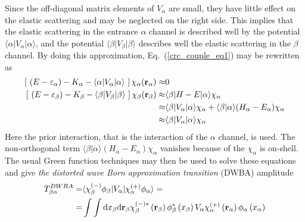 \documentclass[
11pt, %
english, %
onehalfspacing, %
headsepline, %
]{MastersDoctoralThesis} %
\begin{document}
Since the off-diagonal matrix elements of $V_\alpha$ are small, they have little effect on the elastic scattering and may be neglected on the right side. 
This implies that the elastic scattering in the entrance $\alpha$ channel is described well by the potential $\langle \alpha \vert V_\alpha \vert \alpha \rangle$, and the potential $\langle \beta \vert V_\beta \vert \beta \rangle$ describes well the elastic scattering in the $\beta$ channel.
By doing this approximation, Eq.~(\ref{crc_couple_eq1}) may be rewritten as
\begin{align}
\left[ ~\left(E-\varepsilon_\alpha \right)  -K_\alpha -
\langle \alpha \vert V_\alpha \vert \alpha \rangle ~\right] 
\chi_\alpha ({\bf r}_\alpha) \approx & 0
 \nonumber \\
\left[ ~\left(E-\varepsilon_\beta \right)  -K_\beta -
\langle \beta \vert V_\beta \vert \beta \rangle ~\right] 
\chi_\beta ({\bf r}_\beta) \approx &
\langle \beta \vert H-E \vert \alpha \rangle \chi_\alpha
\nonumber \\
\approx &
\langle \beta \vert V_\alpha \vert  \alpha \rangle \chi_\alpha + \langle \beta \vert \alpha \rangle (H_\alpha - E_\alpha) \chi_\alpha 
\nonumber \\
\approx & \langle \beta \vert V_\alpha \vert  \alpha \rangle \chi_\alpha
\label{crc_couple_eq2}
\end{align}
 Here the prior interaction, that is the interaction of the $\alpha$ channel, is used. The non-orthogonal term $\langle \beta \vert \alpha \rangle (H_\alpha - E_\alpha) \chi_\alpha$ vanishes because of the $\chi_\alpha$ is on-shell. The usual Green function techniques may then be used to solve these equations and give \textit{the  distorted wave Born approximation transition} (DWBA) amplitude 
 \begin{align}
 T_{\beta \alpha}^{DWBA} =& \langle \chi_\beta^{(-)} \phi_\beta  \vert V_\alpha \vert
 \chi_\alpha^{(+)} \phi_\alpha \rangle = \nonumber \\
= & \int \int \text{d}x_\beta \text{d}{\bf r}_\beta \chi_\beta^{(-)*} \left( {\bf r}_\beta \right)\phi_\beta^{*} \left( x_\beta \right) V_\alpha 
 \chi_\alpha^{(+)} \left( {\bf r}_\alpha \right)\phi_\alpha \left( x_\alpha \right)
 \end{align}
 
\end{document}
